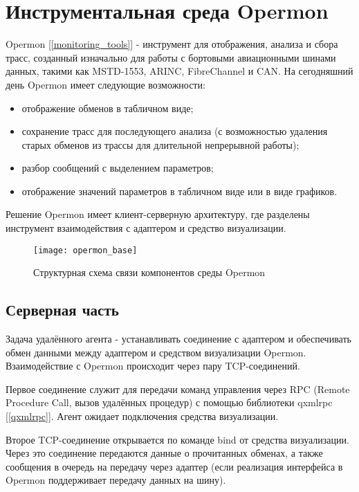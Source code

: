 \section{Инструментальная среда Opermon}

\label{opermon}

Opermon [\ref{monitoring_tools}] - инструмент для отображения, анализа и сбора трасс, созданный изначально для работы с бортовыми авиационными шинами данных, такими как MSTD-1553, ARINC, FibreChannel и CAN. На сегодняшний день Opermon имеет следующие возможности:

\begin{itemize}
 \item отображение обменов в табличном виде;
 \item сохранение трасс для последующего анализа (с возможностью удаления старых обменов из трассы для длительной непрерывной работы);
 \item разбор сообщений с выделением параметров;
 \item отображение значений параметров в табличном виде или в виде графиков.
\end{itemize}

Решение Opermon имеет клиент-серверную архитектуру, где разделены инструмент взаимодействия с адаптером и средство визуализации. 

\begin{figure}[H]
 \centering
 \texttt{[image: opermon\_base]}
 \caption{Структурная схема связи компонентов среды Opermon}
 \label{fig:opermon_base}
\end{figure}

\subsection{Серверная часть}

\label{agent_base}

Задача удалённого агента - устанавливать соединение с адаптером и обеспечивать обмен данными между адаптером и средством визуализации Opermon. Взаимодействие с Opermon происходит через пару TCP-соединений.

Первое соединение служит для передачи команд управления через RPC (Remote Procedure Call, вызов удалённых процедур) с помощью библиотеки qxmlrpc [\ref{qxmlrpc}]. Агент ожидает подключения средства визуализации.

Второе TCP-соединение открывается по команде bind от средства визуализации. Через это соединение передаются данные о прочитанных обменах, а также сообщения в очередь на передачу через адаптер (если реализация интерфейса в Opermon поддерживает передачу данных на шину).

